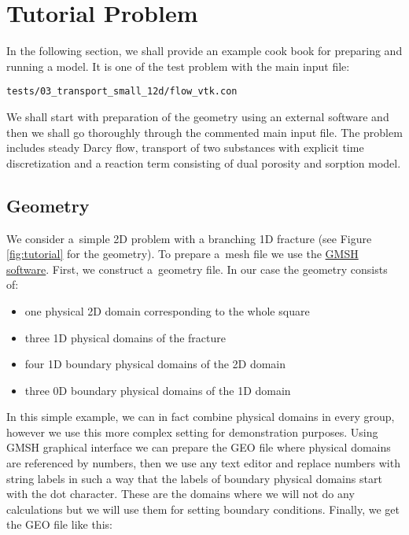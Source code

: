 

\section{Tutorial Problem}
In the following section, we shall provide an example cook book for preparing and running a model. It is 
one of the test problem with the main input file:
\begin{verbatim}
tests/03_transport_small_12d/flow_vtk.con
\end{verbatim}
We shall start with preparation of the geometry using an external software and then we shall go thoroughly through the 
commented main input file. The problem includes steady Darcy flow, transport of two substances with explicit
time discretization and a reaction term consisting of dual porosity and sorption model.

\subsection{Geometry}
We consider a~simple 2D problem with a branching 1D fracture (see Figure \ref{fig:tutorial} for the geometry). 
To prepare a~mesh file we use the \href{http://geuz.org/gmsh/}{GMSH software}.
First, we construct a~geometry file. In our case the geometry consists of: 
\begin{itemize}
 \item one physical 2D domain corresponding to the whole square
 \item three 1D physical domains of the fracture
 \item four 1D boundary physical domains of the 2D domain
 \item three 0D boundary physical domains of the 1D domain
\end{itemize}
In this simple example, we can in fact combine physical domains in every group, however we use this more complex setting for
demonstration purposes. Using GMSH graphical interface we can prepare the GEO file where physical domains are referenced by numbers, then we use 
any text editor and replace numbers with string labels in such a way that the labels of boundary physical domains start with the dot character. 
These are the domains where we will not do any calculations but we will use them for setting boundary conditions.
Finally, we get the GEO file like this:

